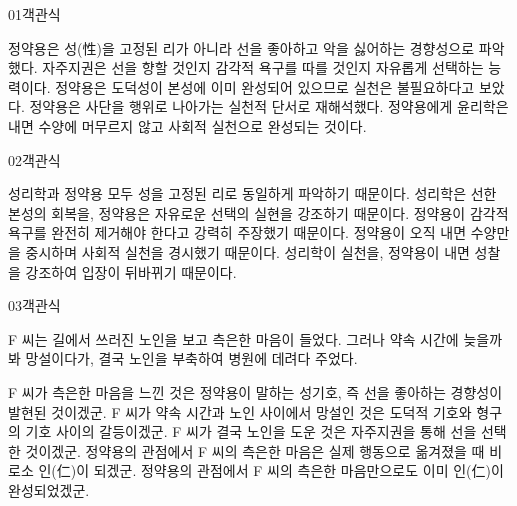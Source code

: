 \documentclass[fs85,seriesWit]{korfarm-base}
\begin{document}
\kfBeginMC
\begin{kfQBlock}{01}{객관식}
\begin{kfChoices}
\kfChoice 정약용은 성(性)을 고정된 리가 아니라 선을 좋아하고 악을 싫어하는 경향성으로 파악했다.
\kfChoice 자주지권은 선을 향할 것인지 감각적 욕구를 따를 것인지 자유롭게 선택하는 능력이다.
\kfChoice 정약용은 도덕성이 본성에 이미 완성되어 있으므로 실천은 불필요하다고 보았다.
\kfChoice 정약용은 사단을 행위로 나아가는 실천적 단서로 재해석했다.
\kfChoice 정약용에게 윤리학은 내면 수양에 머무르지 않고 사회적 실천으로 완성되는 것이다.
\end{kfChoices}
\end{kfQBlock}

\begin{kfQBlock}{02}{객관식}
\begin{kfChoices}
\kfChoice 성리학과 정약용 모두 성을 고정된 리로 동일하게 파악하기 때문이다.
\kfChoice 성리학은 선한 본성의 회복을, 정약용은 자유로운 선택의 실현을 강조하기 때문이다.
\kfChoice 정약용이 감각적 욕구를 완전히 제거해야 한다고 강력히 주장했기 때문이다.
\kfChoice 정약용이 오직 내면 수양만을 중시하며 사회적 실천을 경시했기 때문이다.
\kfChoice 성리학이 실천을, 정약용이 내면 성찰을 강조하여 입장이 뒤바뀌기 때문이다.
\end{kfChoices}
\end{kfQBlock}

\begin{kfQBlock}{03}{객관식}
\begin{kfEvidence}F 씨는 길에서 쓰러진 노인을 보고 측은한 마음이 들었다. 그러나 약속 시간에 늦을까 봐 망설이다가, 결국 노인을 부축하여 병원에 데려다 주었다.\end{kfEvidence}
\begin{kfChoices}
\kfChoice F 씨가 측은한 마음을 느낀 것은 정약용이 말하는 성기호, 즉 선을 좋아하는 경향성이 발현된 것이겠군.
\kfChoice F 씨가 약속 시간과 노인 사이에서 망설인 것은 도덕적 기호와 형구의 기호 사이의 갈등이겠군.
\kfChoice F 씨가 결국 노인을 도운 것은 자주지권을 통해 선을 선택한 것이겠군.
\kfChoice 정약용의 관점에서 F 씨의 측은한 마음은 실제 행동으로 옮겨졌을 때 비로소 인(仁)이 되겠군.
\kfChoice 정약용의 관점에서 F 씨의 측은한 마음만으로도 이미 인(仁)이 완성되었겠군.
\end{kfChoices}
\end{kfQBlock}
\end{document}
